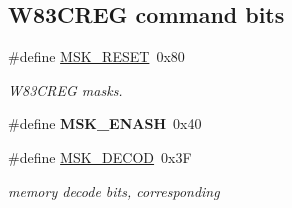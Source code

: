\subsection*{W83\+C\+R\+EG command bits}
\begin{DoxyCompactItemize}
\item 
\mbox{\label{group__gumstix__dp8390_ga2e1809bf92375e9657993ed5391f857b}} 
\#define \mbox{\hyperlink{group__gumstix__dp8390_ga2e1809bf92375e9657993ed5391f857b}{M\+S\+K\+\_\+\+R\+E\+S\+ET}}~0x80
\begin{DoxyCompactList}\small\item\em W83\+C\+R\+EG masks. \end{DoxyCompactList}\item 
\mbox{\label{group__gumstix__dp8390_gab153bf9aaad9c238b5fea0ce3680722a}} 
\#define {\bfseries M\+S\+K\+\_\+\+E\+N\+A\+SH}~0x40
\item 
\mbox{\label{group__gumstix__dp8390_ga5137b1f7677ca9234265ac1ae1aadc27}} 
\#define \mbox{\hyperlink{group__gumstix__dp8390_ga5137b1f7677ca9234265ac1ae1aadc27}{M\+S\+K\+\_\+\+D\+E\+C\+OD}}~0x3F
\begin{DoxyCompactList}\small\item\em memory decode bits, corresponding \end{DoxyCompactList}\end{DoxyCompactItemize}
